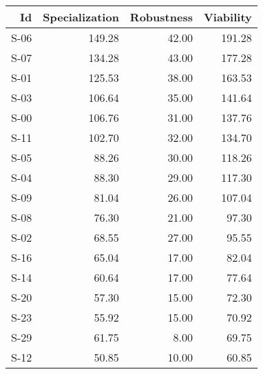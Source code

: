 

\begin{tabular}{ | r | r | r | r | }
    \hline
                    Id  &  Specialization  &      Robustness  &       Viability  \\
    \hline
    \hline
                  S-06  &          149.28  &           42.00  &          191.28  \\
    \hline
                  S-07  &          134.28  &           43.00  &          177.28  \\
    \hline
                  S-01  &          125.53  &           38.00  &          163.53  \\
    \hline
                  S-03  &          106.64  &           35.00  &          141.64  \\
    \hline
                  S-00  &          106.76  &           31.00  &          137.76  \\
    \hline
                  S-11  &          102.70  &           32.00  &          134.70  \\
    \hline
                  S-05  &           88.26  &           30.00  &          118.26  \\
    \hline
                  S-04  &           88.30  &           29.00  &          117.30  \\
    \hline
                  S-09  &           81.04  &           26.00  &          107.04  \\
    \hline
                  S-08  &           76.30  &           21.00  &           97.30  \\
    \hline
                  S-02  &           68.55  &           27.00  &           95.55  \\
    \hline
                  S-16  &           65.04  &           17.00  &           82.04  \\
    \hline
                  S-14  &           60.64  &           17.00  &           77.64  \\
    \hline
                  S-20  &           57.30  &           15.00  &           72.30  \\
    \hline
                  S-23  &           55.92  &           15.00  &           70.92  \\
    \hline
                  S-29  &           61.75  &            8.00  &           69.75  \\
    \hline
                  S-12  &           50.85  &           10.00  &           60.85  \\

\end{tabular}
